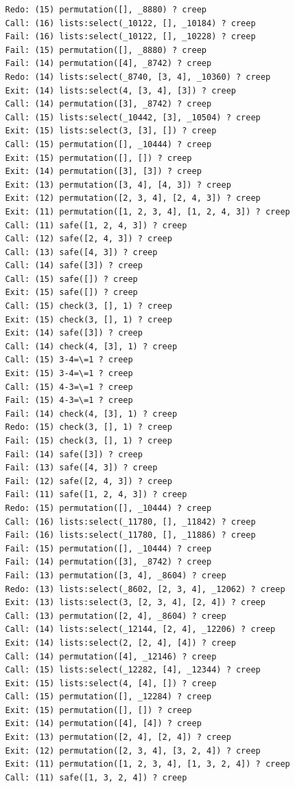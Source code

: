 \documentclass{article}
\begin{document}
\begin{verbatim}
   Redo: (15) permutation([], _8880) ? creep
   Call: (16) lists:select(_10122, [], _10184) ? creep
   Fail: (16) lists:select(_10122, [], _10228) ? creep
   Fail: (15) permutation([], _8880) ? creep
   Fail: (14) permutation([4], _8742) ? creep
   Redo: (14) lists:select(_8740, [3, 4], _10360) ? creep
   Exit: (14) lists:select(4, [3, 4], [3]) ? creep
   Call: (14) permutation([3], _8742) ? creep
   Call: (15) lists:select(_10442, [3], _10504) ? creep
   Exit: (15) lists:select(3, [3], []) ? creep
   Call: (15) permutation([], _10444) ? creep
   Exit: (15) permutation([], []) ? creep
   Exit: (14) permutation([3], [3]) ? creep
   Exit: (13) permutation([3, 4], [4, 3]) ? creep
   Exit: (12) permutation([2, 3, 4], [2, 4, 3]) ? creep
   Exit: (11) permutation([1, 2, 3, 4], [1, 2, 4, 3]) ? creep
   Call: (11) safe([1, 2, 4, 3]) ? creep
   Call: (12) safe([2, 4, 3]) ? creep
   Call: (13) safe([4, 3]) ? creep
   Call: (14) safe([3]) ? creep
   Call: (15) safe([]) ? creep
   Exit: (15) safe([]) ? creep
   Call: (15) check(3, [], 1) ? creep
   Exit: (15) check(3, [], 1) ? creep
   Exit: (14) safe([3]) ? creep
   Call: (14) check(4, [3], 1) ? creep
   Call: (15) 3-4=\=1 ? creep
   Exit: (15) 3-4=\=1 ? creep
   Call: (15) 4-3=\=1 ? creep
   Fail: (15) 4-3=\=1 ? creep
   Fail: (14) check(4, [3], 1) ? creep
   Redo: (15) check(3, [], 1) ? creep
   Fail: (15) check(3, [], 1) ? creep
   Fail: (14) safe([3]) ? creep
   Fail: (13) safe([4, 3]) ? creep
   Fail: (12) safe([2, 4, 3]) ? creep
   Fail: (11) safe([1, 2, 4, 3]) ? creep
   Redo: (15) permutation([], _10444) ? creep
   Call: (16) lists:select(_11780, [], _11842) ? creep
   Fail: (16) lists:select(_11780, [], _11886) ? creep
   Fail: (15) permutation([], _10444) ? creep
   Fail: (14) permutation([3], _8742) ? creep
   Fail: (13) permutation([3, 4], _8604) ? creep
   Redo: (13) lists:select(_8602, [2, 3, 4], _12062) ? creep
   Exit: (13) lists:select(3, [2, 3, 4], [2, 4]) ? creep
   Call: (13) permutation([2, 4], _8604) ? creep
   Call: (14) lists:select(_12144, [2, 4], _12206) ? creep
   Exit: (14) lists:select(2, [2, 4], [4]) ? creep
   Call: (14) permutation([4], _12146) ? creep
   Call: (15) lists:select(_12282, [4], _12344) ? creep
   Exit: (15) lists:select(4, [4], []) ? creep
   Call: (15) permutation([], _12284) ? creep
   Exit: (15) permutation([], []) ? creep
   Exit: (14) permutation([4], [4]) ? creep
   Exit: (13) permutation([2, 4], [2, 4]) ? creep
   Exit: (12) permutation([2, 3, 4], [3, 2, 4]) ? creep
   Exit: (11) permutation([1, 2, 3, 4], [1, 3, 2, 4]) ? creep
   Call: (11) safe([1, 3, 2, 4]) ? creep

\end{verbatim}
\end{document}
